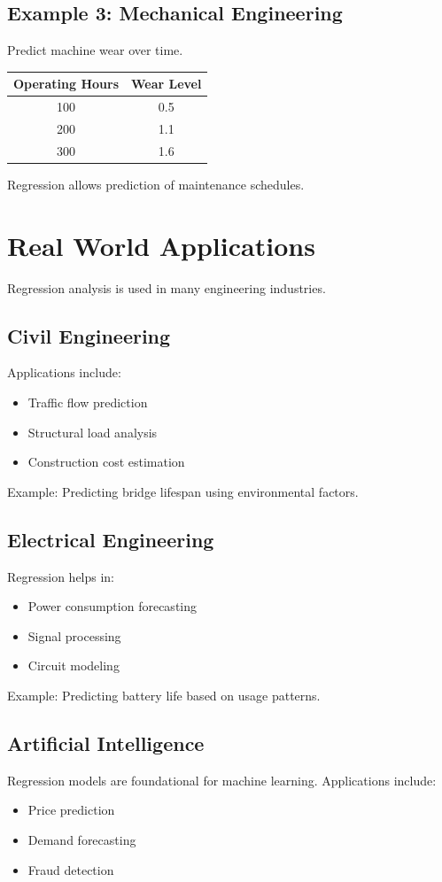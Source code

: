 \documentclass[12pt,a4paper]{article}
\begin{document}
	\subsection{Example 3: Mechanical Engineering}
	Predict machine wear over time.
	\begin{table}[h!]
		\centering
		\begin{tabular}{|c|c|}
			\hline
			\textbf{Operating Hours} & \textbf{Wear Level} \\
			\hline
			100 & 0.5 \\
			200 & 1.1 \\
			300 & 1.6 \\
			\hline
		\end{tabular}
	\end{table}
	Regression allows prediction of maintenance schedules.
	
	\section{Real World Applications}
	Regression analysis is used in many engineering industries.
	
	\subsection{Civil Engineering}
	Applications include:
	\begin{itemize}
		\item Traffic flow prediction
		\item Structural load analysis
		\item Construction cost estimation
	\end{itemize}
	Example: Predicting bridge lifespan using environmental factors.
	
	\subsection{Electrical Engineering}
	Regression helps in:
	\begin{itemize}
		\item Power consumption forecasting
		\item Signal processing
		\item Circuit modeling
	\end{itemize}
	Example: Predicting battery life based on usage patterns.
	
	\subsection{Artificial Intelligence}
	Regression models are foundational for machine learning. Applications include:
	\begin{itemize}
		\item Price prediction
		\item Demand forecasting
		\item Fraud detection
	\end{itemize}
	
\end{document}
